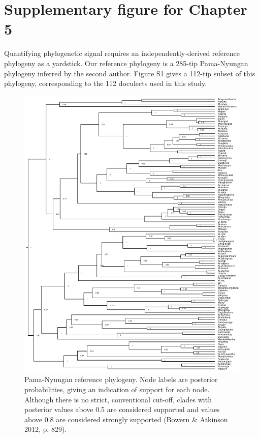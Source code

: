 \chapter{Supplementary figure for Chapter 5}

Quantifying phylogenetic signal requires an independently-derived
reference phylogeny as a yardstick. Our reference phylogeny is a 285-tip
Pama-Nyungan phylogeny inferred by the second author. Figure S1 gives a
112-tip subset of this phylogeny, corresponding to the 112 doculects
used in this study.

\begin{figure}
\includegraphics[width=1\linewidth]{Appendix-A/fig/PN_beast_pruned} \caption[Pama-Nyungan reference phylogeny]{Pama-Nyungan reference phylogeny. Node labels are posterior probabilities, giving an indication of support for each node. Although there is no strict, conventional cut-off, clades with posterior values above 0.5 are considered supported and values above 0.8 are considered strongly supported (Bowern \& Atkinson 2012, p. 829).}\label{fig:plot-ref-tree2}
\end{figure}

